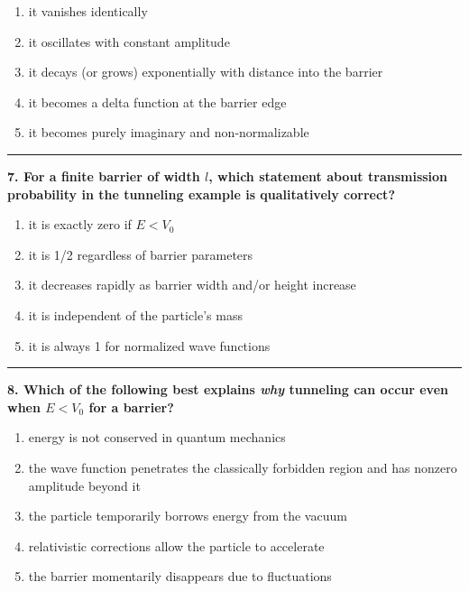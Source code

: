 \documentclass[
  english,
  9pt,
]{extbook}
\providecommand{\tightlist}{%
  \setlength{\itemsep}{0pt}\setlength{\parskip}{0pt}}
\theoremstyle{definition}
\theoremstyle{definition}
\theoremstyle{definition}
\theoremstyle{definition}
\theoremstyle{remark}
\begin{document}
\begin{enumerate}
\def\labelenumi{\alph{enumi}.}
\tightlist
\item
  it vanishes identically\\
\item
  it oscillates with constant amplitude\\
\item
  it decays (or grows) exponentially with distance into the barrier\\
\item
  it becomes a delta function at the barrier edge\\
\item
  it becomes purely imaginary and non‑normalizable
\end{enumerate}

\begin{center}\rule{0.5\linewidth}{0.5pt}\end{center}

\textbf{7. For a finite barrier of width \(l\), which statement about transmission probability in the tunneling example is qualitatively correct?}

\begin{enumerate}
\def\labelenumi{\alph{enumi}.}
\tightlist
\item
  it is exactly zero if \(E < V_0\)\\
\item
  it is 1/2 regardless of barrier parameters\\
\item
  it decreases rapidly as barrier width and/or height increase\\
\item
  it is independent of the particle's mass\\
\item
  it is always 1 for normalized wave functions
\end{enumerate}

\begin{center}\rule{0.5\linewidth}{0.5pt}\end{center}

\textbf{8. Which of the following best explains \emph{why} tunneling can occur even when \(E < V_0\) for a barrier?}

\begin{enumerate}
\def\labelenumi{\alph{enumi}.}
\tightlist
\item
  energy is not conserved in quantum mechanics\\
\item
  the wave function penetrates the classically forbidden region and has nonzero amplitude beyond it\\
\item
  the particle temporarily borrows energy from the vacuum\\
\item
  relativistic corrections allow the particle to accelerate\\
\item
  the barrier momentarily disappears due to fluctuations
\end{enumerate}
\end{document}
